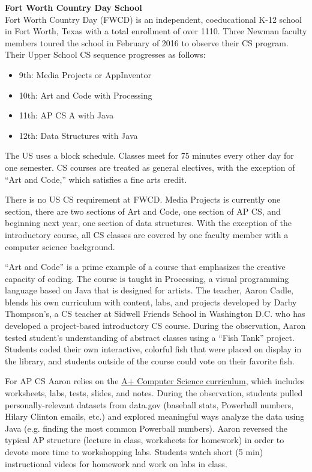 \textbf{Fort Worth Country Day School} \\
Fort Worth Country Day (FWCD) is an independent, coeducational K-12 school in Fort Worth, Texas with a total enrollment of over 1110. Three Newman faculty members toured the school in February of 2016 to observe their CS program. Their Upper School CS sequence progresses as follows: 
\begin{itemize}
	\item 9th: Media Projects or AppInventor
	\item 10th: Art and Code with Processing
	\item 11th: AP CS A with Java
	\item 12th: Data Structures with Java
\end{itemize}
The US uses a block schedule. Classes meet for 75 minutes every other day for one semester. CS courses are treated as general electives, with the exception of “Art and Code,” which satisfies a fine arts credit. \par
There is no US CS requirement at FWCD. Media Projects is currently one section, there are two sections of Art and Code, one section of AP CS, and beginning next year, one section of data structures. With the exception of the introductory course, all CS classes are covered by one faculty member with a computer science background. \par
``Art and Code'' is a prime example of a course that emphasizes the creative capacity of coding. The course is taught in Processing, a visual programming language based on Java that is designed for artists. The teacher, Aaron Cadle, blends his own curriculum with content, labs, and projects developed by Darby Thompson’s, a CS teacher at Sidwell Friends School in Washington D.C. who has developed a project-based introductory CS course. During the observation, Aaron tested student’s understanding of abstract classes using a “Fish Tank” project. Students coded their own interactive, colorful fish that were placed on display in the library, and students outside of the course could vote on their favorite fish. \par
For AP CS Aaron relies on the \href{http://apluscompsci.com/}{A+ Computer Science curriculum}, which includes worksheets, labs, tests, slides, and notes. During the observation, students pulled personally-relevant datasets from data.gov (baseball stats, Powerball numbers, Hilary Clinton emails, etc.) and explored meaningful ways analyze the data using Java (e.g. finding the most common Powerball numbers). Aaron reversed the typical AP structure (lecture in class, worksheets for homework) in order to devote more time to workshopping labs. Students watch short (5 min) instructional videos for homework and work on labs in class. \par
